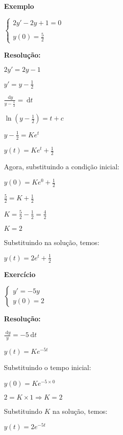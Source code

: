 \documentclass[a4paper]{article}
\newcommand{\ud}{\mathrm{\ d}}
\begin{document}
\newpage
\begin{multicols}{2}
{\bf Exemplo}

$
\left\{
  \begin{array}{l}
    2y'-2y +1 =0\\
    \\
    y(0)=\frac{5}{2}
  \end{array}
\right.
$

\bigskip
{\bf Resolução:}

$2y' = 2y - 1$

$y' = y - \frac{1}{2}$

\smallskip

$\frac{\ud y}{y - \frac{1}{2}} = \ud t$

\smallskip

$\ln \left(y - \frac{1}{2} \right) = t + c$

\smallskip

$y - \frac{1}{2}= K e^t$

\smallskip

$y(t) = K e^t + \frac{1}{2}$

\smallskip

Agora, substituindo a condição inicial:

\smallskip

$y(0) = Ke^0 +\frac{1}{2}$

\smallskip

$\frac{5}{2} = K + \frac{1}{2}$

\smallskip

$K=\frac{5}{2}-\frac{1}{2} = \frac{4}{2}$

\smallskip

$K=2$

Substituindo na solução, temos:

\smallskip

$y(t) = 2e^t +\frac{1}{2}$

\hrulefill

{\bf Exercício}

$
\left\{
  \begin{array}{l}
    y'=-5y\\
    y(0)=2
  \end{array}
\right.
$

\bigskip
{\bf Resolução:}

$\frac{\ud y}{y} = -5 \ud t$

$y(t) = Ke^{-5t}$

Substituindo o tempo inicial:

$y(0) = Ke^{-5 \times 0}$

$2 = K \times 1 \Rightarrow K= 2$

Substituindo $K$ na solução, temos:

$y(t) = 2e^{-5t}$
\end{multicols}
\end{document}
